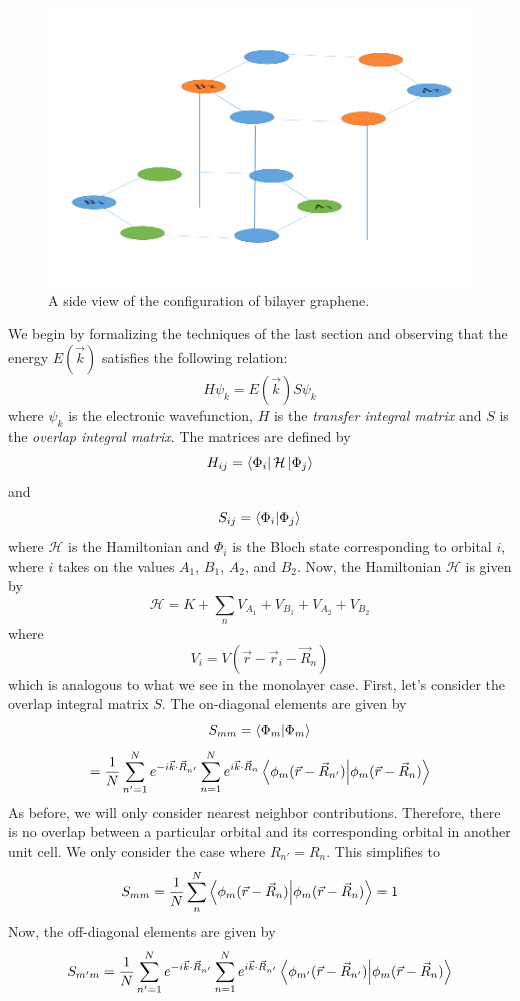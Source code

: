\documentclass{article}
\begin{document}
\begin{figure}[h]
\centering
\includegraphics[scale=.62]{bilayer2}
\caption{A side view of the configuration of bilayer graphene. }
\end{figure}
We begin by formalizing the techniques of the last section and observing that the energy $E(\vec{k})$ satisfies the following relation:
$$H\psi_{k}=E(\vec{k})S\psi_{k}$$
where $\psi_{k}$ is the electronic wavefunction, $H$ is the \emph{transfer integral matrix} and $S$ is the \emph{overlap integral matrix}. The
matrices are defined by
$$H_{ij} = \bra{\Phi_{i}}\mathcal{H}\ket{\Phi_{j}}$$
and
$$S_{ij} = \bra{\Phi_{i}}\ket{\Phi_{j}}$$
where $\mathcal{H}$ is the Hamiltonian and $\Phi_{i}$ is the Bloch state corresponding to orbital $i$, where $i$ takes on the values $A_{1}$, $B_{1}$, $A_{2}$, and $B_{2}$. Now, the Hamiltonian $\mathcal{H}$
is given by
$$ \mathcal{H} = K + \sum_{n}V_{A_{1}} + V_{B_{1}} + V_{A_{2}} + V_{B_{2}} $$
where
$$V_{i} = V(\vec{r} - \vec{r}_{i} - \vec{R}_n)$$
which is analogous to what we see in the monolayer case. First, let's consider the overlap integral matrix $S$. The on-diagonal elements are
given by
$$S_{mm} = \bra{\Phi_{m}}\ket{\Phi_{m}}$$
$$ = \frac{1}{N} \sum_{n'=1}^{N} e^{-i\vec{k}\cdot\vec{R}_{n'}} \sum_{n=1}^{N} e^{i\vec{k}\cdot\vec{R}_{n}} \bra{\phi_{m}(\vec{r} - \vec{R}_{n'})}\ket{\phi_{m}(\vec{r} - \vec{R}_{n})} $$
As before, we will only consider nearest neighbor contributions. Therefore, there is no overlap between a particular orbital and its corresponding orbital
in another unit cell. We only consider the case where $R_{n'} = R_{n}$. This simplifies to
$$S_{mm} = \frac{1}{N}\sum_{n}^{N}\bra{\phi_{m}(\vec{r} - \vec{R}_{n})}\ket{\phi_{m}(\vec{r} - \vec{R}_{n})} = 1$$
Now, the off-diagonal elements are given by
$$ S_{m'm} = \frac{1}{N} \sum_{n'=1}^{N} e^{-i\vec{k}\cdot\vec{R}_{n'}} \sum_{n=1}^{N} e^{i\vec{k}\cdot\vec{R}_{n'}} \bra{\phi_{m'}(\vec{r} - \vec{R}_{n'})}\ket{\phi_{m}(\vec{r} - \vec{R}_{n})} $$
\end{document}
